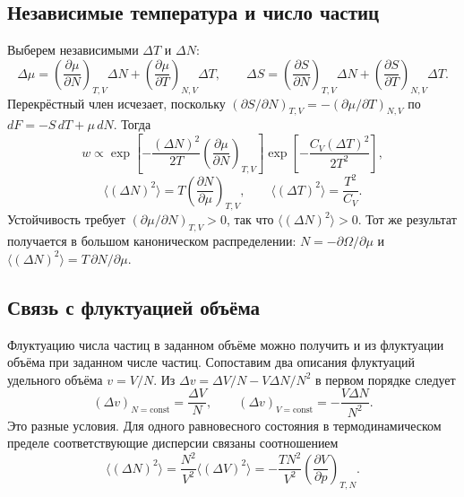 \documentclass[../final.tex]{subfiles}
\begin{document}
\subsection{Независимые температура и число частиц}
Выберем независимыми $\Delta T$ и $\Delta N$:
\begin{equation*}
 \Delta\mu=\left(\frac{\partial\mu}{\partial N}\right)_{T,V}\Delta N
 +\left(\frac{\partial\mu}{\partial T}\right)_{N,V}\Delta T,\qquad
 \Delta S=\left(\frac{\partial S}{\partial N}\right)_{T,V}\Delta N
 +\left(\frac{\partial S}{\partial T}\right)_{N,V}\Delta T.
\end{equation*}
Перекрёстный член исчезает, поскольку
$(\partial S/\partial N)_{T,V}=-(\partial\mu/\partial T)_{N,V}$
по $dF=-S\,dT+\mu\,dN$. Тогда
\begin{equation*}
 w\propto\exp\left[-\frac{(\Delta N)^2}{2T}
 \left(\frac{\partial\mu}{\partial N}\right)_{T,V}\right]
 \exp\left[-\frac{C_V(\Delta T)^2}{2T^2}\right],
\end{equation*}
\begin{equation*}
 \langle(\Delta N)^2\rangle=T\left(\frac{\partial N}{\partial\mu}\right)_{T,V},
 \qquad \langle(\Delta T)^2\rangle=\frac{T^2}{C_V}.
\end{equation*}
Устойчивость требует $(\partial\mu/\partial N)_{T,V}>0$, так что
$\langle(\Delta N)^2\rangle>0$. Тот же результат получается в большом
каноническом распределении: $N=-\partial\Omega/\partial\mu$ и
$\langle(\Delta N)^2\rangle=T\,\partial N/\partial\mu$.

\subsection{Связь с флуктуацией объёма}
Флуктуацию числа частиц в заданном объёме можно получить и из
флуктуации объёма при заданном числе частиц. Сопоставим два описания
флуктуаций удельного объёма $v=V/N$. Из
$\Delta v=\Delta V/N-V\Delta N/N^2$ в первом порядке следует
\begin{equation*}
 (\Delta v)_{N=\mathrm{const}}=\frac{\Delta V}{N},\qquad
 (\Delta v)_{V=\mathrm{const}}=-\frac{V\Delta N}{N^2}.
\end{equation*}
Это разные условия. Для одного равновесного состояния в термодинамическом
пределе соответствующие дисперсии связаны соотношением
\begin{equation*}
 \langle(\Delta N)^2\rangle=\frac{N^2}{V^2}\langle(\Delta V)^2\rangle
 =-\frac{TN^2}{V^2}\left(\frac{\partial V}{\partial p}\right)_{T,N}.
\end{equation*}
\end{document}

